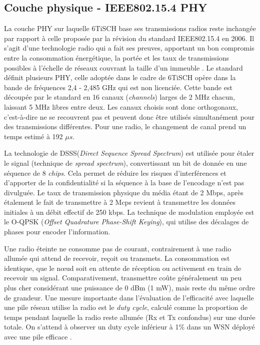 \documentclass[]{report}
\begin{document}
\newpage	
	
	\subsection{Couche physique - IEEE802.15.4 PHY}
	\label{802.15.4PHY}

\par La couche PHY sur laquelle 6TiSCH base ses transmissions radios reste inchangée par rapport à celle proposée par la révision du standard IEEE802.15.4 en 2006. Il s'agit d'une technologie radio qui a fait ses preuves, apportant un bon compromis entre la consommation énergétique, la portée et les taux de transmissions possibles à l'échelle de réseaux couvrant la taille d'un immeuble \cite{stack-IoT}. Le standard définit plusieurs PHY, celle adoptée dans le cadre de 6TiSCH opère dans la bande de fréquences 2,4 - 2,485 GHz qui est non licenciée. Cette bande est découpée par le standard en 16 canaux (\textit{channels}) larges de 2 MHz chacun, laissant 5 MHz libres entre deux. Les canaux choisis sont donc orthogonaux, c'est-à-dire ne se recouvrent pas et peuvent donc être utilisés simultanément pour des transmissions différentes. Pour une radio, le changement de canal prend un temps estimé à 192 $\mu s$.\\

\par La technologie de DSSS(\textit{Direct Sequence Spread Spectrum}) est utilisée pour étaler le signal (technique de \textit{spread spectrum}), convertissant un bit de donnée en une séquence de 8 \textit{chips}. Cela permet de réduire les risques d'interférences et d'apporter de la confidentialité si la séquence à la base de l'encodage n'est pas divulguée. Le taux de transmission physique du média étant de 2 Mbps, après étalement le fait de transmettre à 2 Mcps revient à transmettre les données initiales à un débit effectif de 250 kbps. La technique de modulation employée est le O-QPSK (\textit{Offset Quadrature Phase-Shift Keying}), qui utilise des décalages de phases pour encoder l'information.\\

\par Une radio éteinte ne consomme pas de courant, contrairement à une radio allumée qui attend de recevoir, reçoit ou transmets. La consommation est identique, que le nœud soit en attente de réception ou activement en train de recevoir un signal. Comparativement, transmettre coûte généralement un peu plus cher considérant une puissance de 0 dBm (1 mW)\cite{stack-IoT}, mais reste du même ordre de grandeur. Une mesure importante dans l'évaluation de l'efficacité avec laquelle une pile réseau utilise la radio est le \textit{duty cycle}, calculé comme la proportion de temps pendant laquelle la radio reste allumée (Rx et Tx confondus) sur une durée totale. On s'attend à observer un duty cycle inférieur à 1\% dans un WSN déployé avec une pile efficace \cite{stack-IoT}.\\
\end{document}
